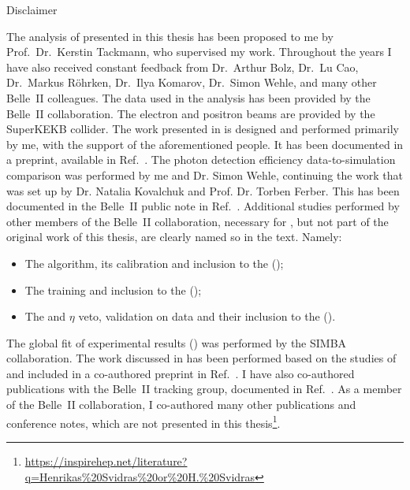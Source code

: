     \begin{abstractpage}{Disclaimer}
    
        The analysis of \BtoXsgamma presented in this thesis has been proposed to me by Prof.~Dr.~Kerstin Tackmann, 
        who supervised my work.
        Throughout the years I have also received constant feedback from Dr.~Arthur Bolz, Dr.~Lu Cao, Dr.~Markus R\"ohrken, Dr.~Ilya Komarov,
        Dr.~Simon Wehle, and many other Belle~II colleagues.
        The data used in the analysis has been provided by the Belle~II collaboration.
        The electron and positron beams are provided by the SuperKEKB collider.
        The work presented in  is designed and performed primarily by me, with the support of the aforementioned people.
        It has been documented in a preprint, available in Ref.~\cite{Belle-II:2022hys}.
        The photon detection efficiency data-to-simulation comparison was performed by me and Dr. Simon Wehle, continuing the work that was set up by Dr. Natalia Kovalchuk and Prof. Dr. Torben Ferber.
        This has been documented in the Belle~II public note in Ref.~\cite{Henrikas:2604}.
        Additional studies performed by other members of the Belle~II collaboration, necessary for \BtoXsgamma, but not part of the original work of this thesis,
        are clearly named so in the text. Namely:
        \begin{itemize}
            \item The \FEI algorithm, its calibration and inclusion to the \basftwo ();
            \item The \ZMVA training and inclusion to the \basftwo  ();
            \item The \piz and $\eta$ veto, validation on data and their inclusion to the \basftwo ().
        \end{itemize}
        The global fit of \BtoXsgamma experimental results () was performed by the SIMBA collaboration.
        The work discussed in  has been performed based on the studies of  and included in a co-authored preprint in Ref.~\cite{Belle-II:2022cgf}.
        I have also co-authored publications with the Belle~II tracking group, documented in Ref.~\cite{BelleIITrackingGroup:2020hpx}.
        As a member of the Belle~II collaboration, I co-authored many other publications and conference notes, which are not presented in this thesis\footnote{{\scriptsize\url{https://inspirehep.net/literature?q=Henrikas\%20Svidras\%20or\%20H.\%20Svidras}}}.
        

\end{abstractpage}
